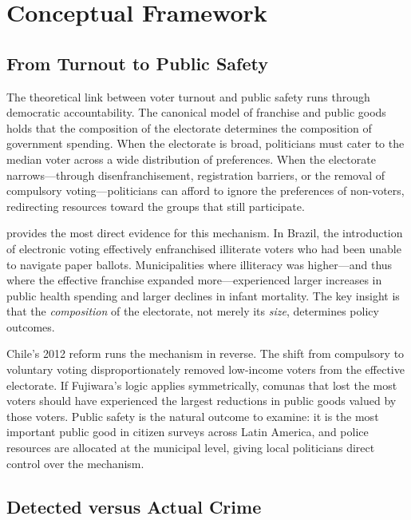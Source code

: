 \documentclass[12pt]{article}
\begin{document}
\section{Conceptual Framework}\label{sec:framework}

\subsection{From Turnout to Public Safety}

The theoretical link between voter turnout and public safety runs through democratic accountability. The canonical model of franchise and public goods \citep{Husted1997,Lott1999} holds that the composition of the electorate determines the composition of government spending. When the electorate is broad, politicians must cater to the median voter across a wide distribution of preferences. When the electorate narrows---through disenfranchisement, registration barriers, or the removal of compulsory voting---politicians can afford to ignore the preferences of non-voters, redirecting resources toward the groups that still participate.

\citet{Fujiwara2015} provides the most direct evidence for this mechanism. In Brazil, the introduction of electronic voting effectively enfranchised illiterate voters who had been unable to navigate paper ballots. Municipalities where illiteracy was higher---and thus where the effective franchise expanded more---experienced larger increases in public health spending and larger declines in infant mortality. The key insight is that the \textit{composition} of the electorate, not merely its \textit{size}, determines policy outcomes.

Chile's 2012 reform runs the mechanism in reverse. The shift from compulsory to voluntary voting disproportionately removed low-income voters from the effective electorate. If Fujiwara's logic applies symmetrically, comunas that lost the most voters should have experienced the largest reductions in public goods valued by those voters. Public safety is the natural outcome to examine: it is the most important public good in citizen surveys across Latin America, and police resources are allocated at the municipal level, giving local politicians direct control over the mechanism.

\subsection{Detected versus Actual Crime}
\end{document}
